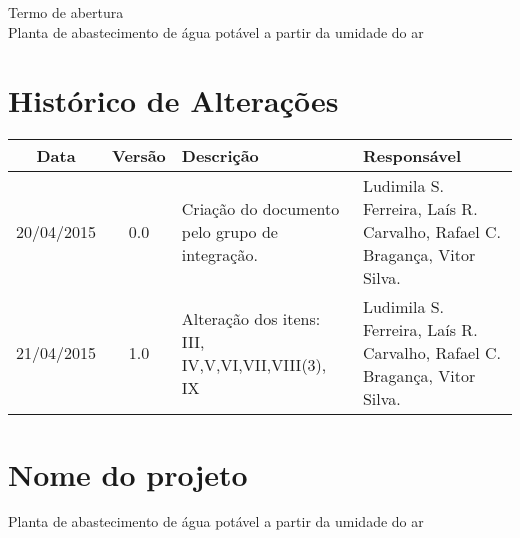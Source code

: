 % 
% 
% 


\begin{center}
 {\large Termo de abertura}\\[0.2cm]
 {Planta de abastecimento de água potável a partir da umidade do ar}\\
 \end{center}
 
 \section{Histórico de Alterações}
\begin{table}[h]
\centering
\begin{tabular}{|c|c|p{6cm}|p{5cm}|}

Data & Versão & Descrição & Responsável\\
\hline                               
20/04/2015 & 0.0 & Criação do documento pelo grupo de integração. & Ludimila S. Ferreira,
Laís R. Carvalho, Rafael C. Bragança, Vitor Silva.\\
\hline
21/04/2015 & 1.0 & Alteração dos itens: III, IV,V,VI,VII,VIII(3), IX & Ludimila S. Ferreira,
Laís R. Carvalho, Rafael C. Bragança, Vitor Silva.\\
\hline
\end{tabular}
\end{table}

\section{Nome do projeto}
  Planta de abastecimento de água potável a partir da umidade do ar
  
